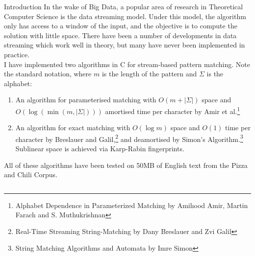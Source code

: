 \documentclass[ %
                    author={Dominic Moylett},
                supervisor={Dr. Raphael Clifford, Dr. Markus Jalsenius and Dr. Benjamin Sach},
                     title={An Empirical Analysis of Data Streaming Algorithms},
                  subtitle={},
                    degree={MEng},
                      year={2014} ]{poster}
\begin{document}

\begin{frame}{} 

\vfill

\begin{columns}[t]
  \begin{column}{0.900\linewidth}
  \begin{block}{\Large Introduction}
  In the wake of Big Data, a popular area of research in Theoretical Computer Science is the data streaming model. Under this model, the algorithm only has access to a window of the input, and the objective is to compute the solution with little space. There have been a number of developments in data streaming which work well in theory, but many have never been implemented in practice.\\
  \vspace{\baselineskip}
  I have implemented two algorithms in C for stream-based pattern matching. Note the standard notation, where $m$ is the length of the pattern and $\Sigma$ is the alphabet:
  \begin{enumerate}
  \item An algorithm for parameterised matching with $O(m + \left|\Sigma\right|)$ space and $O(\log(\min(m, \left|\Sigma\right|)))$ amortised time per character by Amir et al.\footnote{Alphabet Dependence in Parameterized Matching by Amihood Amir, Martin Farach and S. Muthukrishnan}
  \item An algorithm for exact matching with $O(\log m)$ space and $O(1)$ time per character by Breslauer and Galil,\footnote{Real-Time Streaming String-Matching by Dany Breslauer and Zvi Galil} and deamortised by Simon's Algorithm.\footnote{String Matching Algorithms and Automata by Imre Simon} Sublinear space is achieved via Karp-Rabin fingerprints.
  \end{enumerate}

  \noindent
  All of these algorithms have been tested on 50MB of English text from the Pizza and Chili Corpus.
  \end{block}
  \end{column}
\end{columns}

\vfill


\end{frame}
\end{document}
